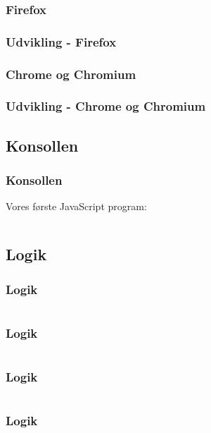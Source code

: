 \subsubsection{Firefox}
\begin{frame}
    \frametitle{Udvikling - Firefox}
    \begin{center}
    \end{center}
\end{frame}

\subsubsection{Chrome og Chromium}
\begin{frame}
    \frametitle{Udvikling - Chrome og Chromium}
    \begin{center}
    \end{center}
\end{frame}

\subsection{Konsollen}
\begin{frame}
    \frametitle{Konsollen}
    Vores første JavaScript program:
    \inputminted{javascript}{../src/frontend/part2_hello/logic.js}
\end{frame}

\subsection{Logik}
\begin{frame}
    \frametitle{Logik}
    \inputminted{javascript}{../src/frontend/part2_console/logic.js}
\end{frame}
\begin{frame}
    \frametitle{Logik}
    \inputminted[highlightlines={4,5,6}]{javascript}{../src/frontend/part2_console/logic.js}
\end{frame}
\begin{frame}
    \frametitle{Logik}
    \inputminted[highlightlines={7}]{javascript}{../src/frontend/part2_console/logic.js}
\end{frame}
\begin{frame}
    \frametitle{Logik}
    \inputminted[highlightlines={5,8}]{javascript}{../src/frontend/part2_console/logic.js}
\end{frame}

